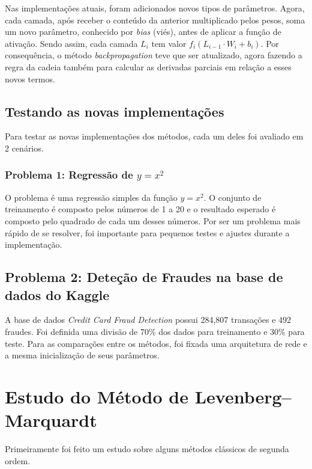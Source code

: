 \documentclass[11pt]{article}
\begin{document}
\begin{itemize}
Nas implementações atuais, foram adicionados novos tipos de parâmetros. Agora, cada camada, após receber o conteúdo da anterior multiplicado pelos pesos, soma um novo parâmetro, conhecido por \textit{bias} (viés), antes de aplicar a função de ativação. Sendo assim, cada camada $L_i$ tem valor $f_i(L_{i-1} \cdot W_i + b_i)$. Por consequência, o método \textit{backpropagation} teve que ser atualizado, agora fazendo a regra da cadeia também para calcular as derivadas parciais em relação a esses novos termos.


\subsection*{Testando as novas implementações}
Para testar as novas implementações dos métodos, cada um deles foi avaliado em 2 cenários.
\subsubsection*{Problema 1: Regressão de $y = x^2$}
O problema é uma regressão simples da função $y = x^2$. O conjunto de treinamento é composto pelos números de 1 a 20 e o resultado esperado é composto pelo quadrado de cada um desses números. Por ser um problema mais rápido de se resolver, foi importante para pequenos testes e ajustes durante a implementação.

\subsection*{Problema 2: Deteção de Fraudes na base de dados do Kaggle}
A base de dados \textit{Credit Card Fraud Detection} possui  284,807 transações e 492 fraudes. Foi definida uma divisão de 70\% dos dados para treinamento e 30\% para teste. Para as comparações entre os métodos, foi fixada uma arquitetura de rede e a mesma inicialização de seus parâmetros.



\end{itemize}   


\section{Estudo do Método de Levenberg–Marquardt}
Primeiramente foi feito um estudo sobre alguns métodos clássicos de segunda ordem.
\end{document}
